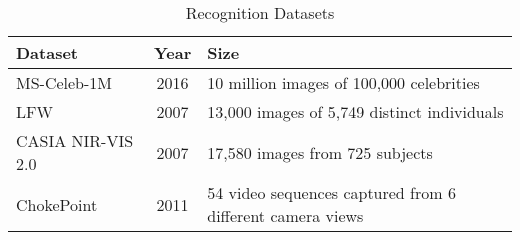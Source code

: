     
\begin{table}[htbp]
\caption{Recognition Datasets}
\begin{center}
\begin{tabularx}{\columnwidth}{|X|c|X|}
\hline
\textbf{Dataset} & \textbf{Year}& \textbf{Size} \\
\hline
MS-Celeb-1M \cite{wanyonyi_open-source_2022} & 2016 & 10 million images of 100,000 celebrities \\
\hline
LFW \cite{kim_face_2022} & 2007 & 13,000 images of 5,749 distinct individuals \\
\hline
CASIA NIR-VIS 2.0 \cite{liu_heterogeneous_2022} & 2007 & 17,580 images from 725 subjects \\
\hline
ChokePoint \cite{barquero_rank-based_2021} & 2011 & 54 video sequences captured from 6 different camera views \\
\hline
\end{tabularx}
\label{rec-ds}
\end{center}
\end{table}